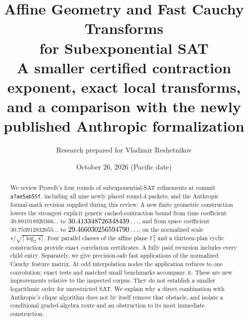 \documentclass[11pt]{article}
\title{Affine Geometry and Fast Cauchy Transforms\\for Subexponential SAT\\[6pt]
\large A smaller certified contraction exponent, exact local transforms,\\and a comparison with the newly published Anthropic formalization}
\author{Research prepared for Vladimir Reshetnikov}
\date{October 26, 2026 (Pacific date)}
\theoremstyle{definition}\newtheorem{definition}[theorem]{Definition}
\theoremstyle{remark}\newtheorem{remark}[theorem]{Remark}
\begin{document}
\maketitle
\begin{abstract}
We review ProveIt's four rounds of subexponential-SAT refinements at
commit \texttt{a7ae5ab55f}, including all nine newly placed round-4 packets, and the Anthropic
formal-math revision supplied during this review. A new finite geometric
construction lowers the strongest explicit generic cached-contraction bound
from time coefficient $30.891018920366\ldots$ to $30.413348726348439\ldots$, and from space
coefficient $30.753912832055\ldots$ to $29.466030256594790\ldots$, on the normalized scale
$s/\sqrt{\lceil\log_2s\rceil}$. Four parallel classes of the affine plane
$\mathbb F_3^2$ and a thirteen-plan cyclic construction provide exact
correlation certificates. A fully paid recursion includes every child entry.
Separately, we give precision-safe fast applications of the normalized
Cauchy feature matrix. At odd interpolation nodes the application reduces
to one convolution; exact tests and matched small benchmarks accompany it.
These are new improvements relative to the inspected corpus. They do not
establish a smaller logarithmic order for unrestricted SAT. We explain why
a direct combination with Anthropic's clique algorithm does not by itself
remove that obstacle, and isolate a conditional graded-algebra route and
an obstruction to its most immediate construction.
\end{abstract}
\setcounter{tocdepth}{1}
\tableofcontents
\newpage









\end{document}
